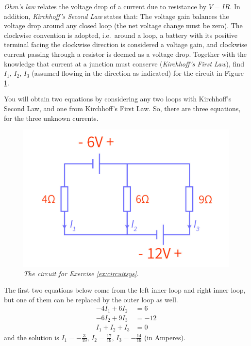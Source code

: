 \begin{Exercise}
\label{ex:circuitsys}
\textit{Ohm's law} relates the voltage drop of a current due to resistance by $V=IR$. In addition, \textit{Kirchhoff’s Second Law} states that: The voltage gain balances the voltage drop around any closed loop (the net voltage change must be zero). The clockwise convention is adopted, i.e.\ around a loop, a battery with its positive terminal facing the clockwise direction is considered a voltage gain, and clockwise current passing through a resistor is deemed as a voltage drop. Together with the knowledge that current at a junction must conserve (\textit{Kirchhoff's First Law}), find $I_1$, $I_2$, $I_3$ (assumed flowing in the direction as indicated) for the circuit in Figure \ref{fig:circuitsys}. \par
You will obtain two equations by considering any two loops with Kirchhoff’s Second Law, and one from Kirchhoff's First Law. So, there are three equations, for the three unknown currents.
\end{Exercise}
\begin{figure}[h!]
\centering
\includegraphics[scale = 0.25]{graphics/circuit.jpg}
\caption{\textit{The circuit for Exercise \ref{ex:circuitsys}.}}
\label{fig:circuitsys}
\end{figure}
\begin{Answer}
The first two equations below come from the left inner loop and right inner loop, but one of them can be replaced by the outer loop as well.
\begin{align*}
-4I_1 + 6I_2 &= 6\\
-6I_2 + 9I_3 &= -12\\
I_1 + I_2 + I_3 &= 0
\end{align*}
and the solution is $I_1 = -\frac{3}{19}$, $I_2 = \frac{17}{19}$, $I_3 = -\frac{14}{19}$ (in Amperes).
\end{Answer}

